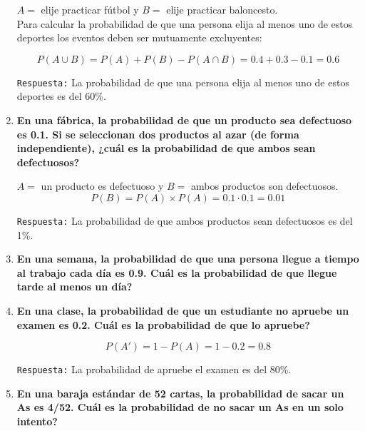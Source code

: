 \documentclass[12pt]{article}
\begin{document}
\begin{enumerate}[label=\textbf{\arabic*.}]
        $A = $ elije practicar fútbol y $B = $ elije practicar baloncesto.\\

        Para calcular la probabilidad de que una persona elija al menos uno de estos deportes 
        los eventos deben ser mutuamente excluyentes:

        \[P(A \cup B) = P(A) + P(B) - P(A \cap B) = 0.4 + 0.3 - 0.1 = 0.6\]

        \texttt{Respuesta:} La probabilidad de que una persona elija al menos uno de estos deportes es del 60\%.



        \item \textbf{En una fábrica, la probabilidad de que un producto sea defectuoso es 0.1. Si se seleccionan dos 
        productos al azar (de forma independiente), ¿cuál es la probabilidad de que ambos sean defectuosos?}

        $A = $ un producto es defectuoso y $B = $ ambos productos son defectuosos.\\

        \[P(B) = P(A) \times P(A) = 0.1 \cdot 0.1 = 0.01\]

        \texttt{Respuesta:} La probabilidad de que ambos productos sean defectuosos es del 1\%.
        


        \item \textbf{En una semana, la probabilidad de que una persona llegue a tiempo al trabajo
        cada día es 0.9. \textquestiondown Cuál es la probabilidad de que llegue tarde al menos un día?}

        
        
        
        \item \textbf{En una clase, la probabilidad de que un estudiante no apruebe un examen es
        0.2. \textquestiondown Cuál es la probabilidad de que lo apruebe?}

        \[P(A') = 1 - P(A) = 1 - 0.2 = 0.8\]

        \texttt{Respuesta:} La probabilidad de apruebe el examen es del 80\%.


        
        \item \textbf{En una baraja estándar de 52 cartas, la probabilidad de sacar un As es 4/52.
        \textquestiondown Cuál es la probabilidad de no sacar un As en un solo intento?}


\end{enumerate}
\end{document}
